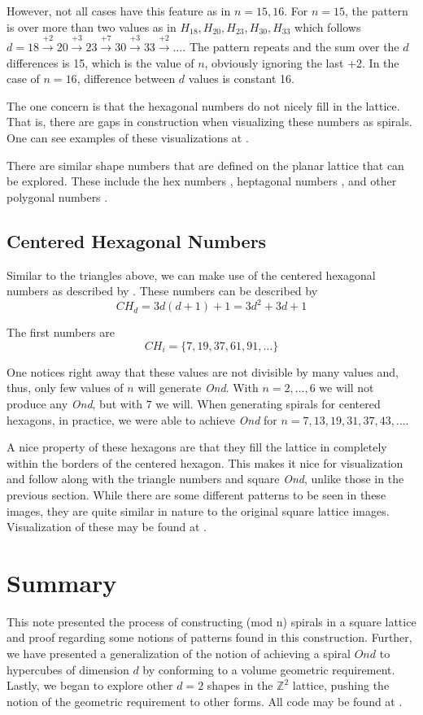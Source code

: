 \documentclass[11pt,reqno]{amsart}
\theoremstyle{mydef}
\begin{document}
However, not all cases have this feature as in $n = 15, 16$. For $n = 15$, the pattern is over more
than two values  as in $H_{18}, H_{20}, H_{23}, H_{30}, H_{33}$ which follows 
$d = 18 \xrightarrow{+2} 20 \xrightarrow{+3} 23 \xrightarrow{+7} 30 \xrightarrow{+3} 33 \xrightarrow{+2} \ldots$. The pattern repeats and the sum
over the $d$ differences is 15, which is the value of $n$, obviously ignoring the last +2. In the case of $n = 16$, difference between $d$ values is constant 16.

The one concern is that the hexagonal numbers do not nicely fill in the lattice. That is, there are gaps in construction when
visualizing these numbers as spirals. One can see examples of these visualizations at \cite{hexvis}.

There are similar shape numbers that are defined on the planar lattice that can be explored. These include the 
hex numbers \cite{HexNum}, heptagonal numbers \cite{Hepta}, and other polygonal numbers \cite{Polyg}.

\subsection{Centered Hexagonal Numbers}

Similar to the triangles above, we can make use of the centered hexagonal numbers as described by
\cite{oeisCHex}.  These numbers can be described by
\[
	CH_d = 3d(d+1)+1 = 3d^2 + 3d + 1
\]

The first numbers are
\[
  	CH_i = \{ 7, 19, 37, 61, 91, \ldots \}
\]

One notices right away that these values are not divisible by many values and, thus, only few values of $n$ will generate
\emph{Ond}. With $n = 2, \ldots, 6$ we will not produce any \emph{Ond}, but with $7$ we will. When generating spirals for
centered hexagons, in practice, we were able to achieve \emph{Ond} for $n = 7, 13, 19, 31, 37, 43, \ldots$. 

A nice property of these hexagons are that they fill the lattice in completely within the borders of the centered hexagon.
This makes it nice for visualization and follow along with the triangle numbers and square \emph{Ond}, unlike those in 
the previous section. While there are some different patterns to be seen in these images, they are quite similar in nature
to the original square lattice images. Visualization of these may be found at \cite{chexvis}.

\section{Summary}
This note presented the process of constructing (mod n) spirals in a square lattice and proof regarding some 
notions of patterns found in this construction. Further, we have presented a generalization of the notion of
achieving a spiral $Ond$ to hypercubes of dimension $d$ by conforming to a volume geometric requirement.
Lastly, we began to explore other $d = 2$ shapes in the $\mathbb{Z}^2$ lattice, pushing the notion of the 
geometric requirement to other forms. All code may be found at \cite{PySquare}.
\end{document}
